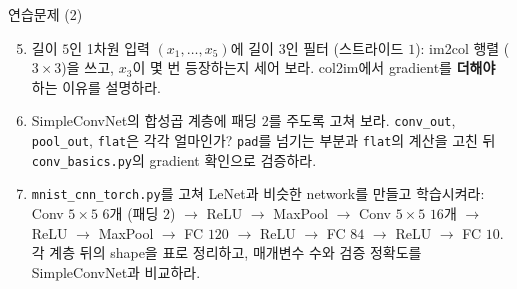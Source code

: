\documentclass[aspectratio=169,11pt]{beamer}
\begin{document}
\begin{frame}{연습문제 (2)}
\small
\begin{enumerate}
\setcounter{enumi}{4}
\item 길이 $5$인 1차원 입력 $(x_1,\ldots,x_5)$에 길이 $3$인 필터 (스트라이드 $1$): im2col 행렬 ($3\times3$)을 쓰고,
$x_3$이 몇 번 등장하는지 세어 보라. col2im에서 gradient를 \textbf{더해야} 하는 이유를 설명하라.
\item SimpleConvNet의 합성곱 계층에 패딩 $2$를 주도록 고쳐 보라.
\texttt{conv\_out}, \texttt{pool\_out}, \texttt{flat}은 각각 얼마인가? \texttt{pad}를 넘기는 부분과 \texttt{flat}의 계산을 고친 뒤
\texttt{conv\_basics.py}의 gradient 확인으로 검증하라.
\item \texttt{mnist\_cnn\_torch.py}를 고쳐 LeNet과 비슷한 network를 만들고 학습시켜라:\\
Conv $5\times5$ $6$개 (패딩 $2$) $\to$ ReLU $\to$ MaxPool $\to$ Conv $5\times5$ $16$개 $\to$ ReLU $\to$ MaxPool $\to$ FC $120$ $\to$ ReLU $\to$ FC $84$ $\to$ ReLU $\to$ FC $10$.
각 계층 뒤의 shape을 표로 정리하고, 매개변수 수와 검증 정확도를 SimpleConvNet과 비교하라.
\end{enumerate}
\end{frame}
\end{document}
